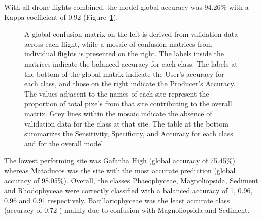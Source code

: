 \documentclass[
  number]{elsarticle}
\begin{document}
With all drone flights combined, the model global accuracy was 94.26\%
with a Kappa coefficient of 0.92 (Figure~\ref{fig-Validation}).

\label{cell-fig-Validation}
\begin{figure}[H]


\caption{\label{fig-Validation}A global confusion matrix on the left is
derived from validation data across each flight, while a mosaic of
confusion matrices from individual flights is presented on the right.
The labels inside the matrices indicate the balanced accuracy for each
class. The labels at the bottom of the global matrix indicate the User's
accuracy for each class, and those on the right indicate the Producer's
Accuracy. The values adjacent to the names of each site represent the
proportion of total pixels from that site contributing to the overall
matrix. Grey lines within the mosaic indicate the absence of validation
data for the class at that site. The table at the bottom summarizes the
Sensitivity, Specificity, and Accuracy for each class and for the
overall model.}

\end{figure}%

The lowest performing site was Gafanha High (global accuracy of 75.45\%)
whereas Mataducos was the site with the most accurate prediction (global
accuracy of 98.05\%). Overall, the classes Phaeophyceae, Magnoliopsida,
Sediment and Rhodophyceae were correctly classified with a balanced
accuracy of 1, 0.96, 0.96 and 0.91 respectively. Bacillariophyceae was
the least accurate class (accuracy of 0.72 ) mainly due to confusion
with Magnoliopsida and Sediment.
\end{document}
